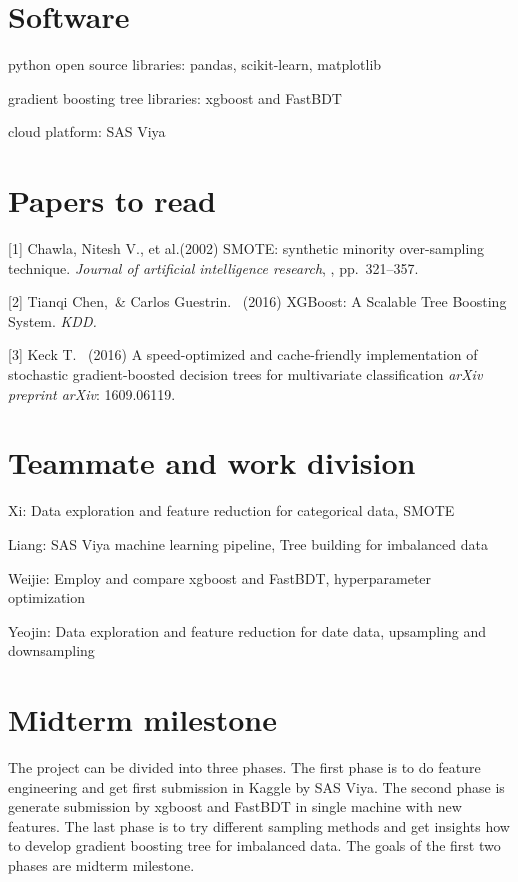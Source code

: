 \documentclass{article}
\begin{document}
\section{Software}

python open source libraries: pandas, scikit-learn, matplotlib

gradient boosting tree libraries: xgboost and FastBDT

cloud platform: SAS Viya

\section{Papers to read}

[1] Chawla, Nitesh V., et al.(2002) SMOTE: synthetic minority over-sampling technique. {\it Journal of artificial intelligence research}, , pp.\ 321--357.

[2] Tianqi Chen,\ \& Carlos Guestrin. \ (2016) XGBoost: A Scalable Tree Boosting System. {\it KDD.}

[3] Keck T. \ (2016) A speed-optimized and cache-friendly implementation of stochastic gradient-boosted decision trees for multivariate classification {\it arXiv preprint arXiv}: 1609.06119.



\section{Teammate and work division}
Xi: Data exploration and feature reduction for categorical data, SMOTE

Liang: SAS Viya machine learning pipeline, Tree building for imbalanced data

Weijie: Employ and compare xgboost and FastBDT, hyperparameter optimization

Yeojin: Data exploration and feature reduction for date data, upsampling and downsampling

\section{Midterm milestone}
The project can be divided into three phases. The first phase is to do feature engineering and get first submission in Kaggle by SAS Viya. The second phase is generate submission by xgboost and FastBDT in single machine with new features. The last phase is to try different sampling methods and get insights how to develop gradient boosting tree for imbalanced data. The goals of the first two phases are midterm milestone.
\end{document}
